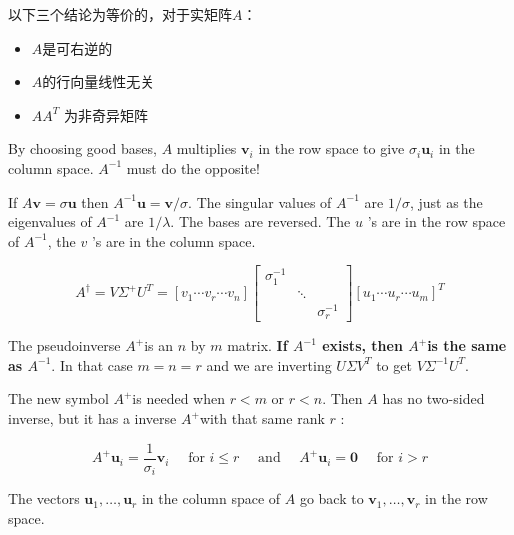 \begin{corollary}
    以下三个结论为等价的，对于实矩阵$A$：

    \begin{itemize}
        \item $A$是可右逆的 
        \item $A$的行向量线性无关
        \item $ A A^{T} $ 为非奇异矩阵
    \end{itemize}
\end{corollary}

By choosing good bases, $A$ multiplies $\boldsymbol{v}_{i}$ in the row space to give $\sigma_{i} \boldsymbol{u}_{i}$ in the column space. $A^{-1}$ must do the opposite! 



If $A \boldsymbol{v}=\sigma \boldsymbol{u}$ then $A^{-1} \boldsymbol{u}=\boldsymbol{v} / \sigma$. The singular values of $A^{-1}$ are $1 / \sigma$, just as the eigenvalues of $A^{-1}$ are $1 / \lambda$. The bases are reversed. The $u$ 's are in the row space of $A^{-1}$, the $v$ 's are in the column space.

\begin{definition}[伪逆$A^{\dagger}$]
    $$A^{\dagger} = V \Sigma^+ U^T = \left[v_{1} \cdots v_{r} \cdots v_{n}\right]\left[\begin{array}{lll}
        \sigma_{1}^{-1} & & \\
        & \ddots & \\
        & & \sigma_{r}^{-1}
        \end{array}\right]\left[u_{1} \cdots u_{r} \cdots u_{m}\right]^{ {T}}$$
\end{definition}

The pseudoinverse $A^{+}$is an $n$ by $m$ matrix. \textbf{If $A^{-1}$ exists, then $A^{+}$is the same as $A^{-1}$}. In that case $m=n=r$ and we are inverting $U \Sigma V^{ {T}}$ to get $V \Sigma^{-1} U^{ {T}}$. 

The new symbol $A^{+}$is needed when $r<m$ or $r<n$. Then $A$ has no two-sided inverse, but it has a inverse $A^{+}$with that same rank $r$ :

$$
A^{+} \boldsymbol{u}_{i}=\frac{1}{\sigma_{i}} \boldsymbol{v}_{i} \quad \text { for } i \leq r \quad \text { and } \quad A^{+} \boldsymbol{u}_{i}=\mathbf{0} \quad \text { for } i>r
$$

The vectors $\boldsymbol{u}_{1}, \ldots, \boldsymbol{u}_{r}$ in the column space of $A$ go back to $\boldsymbol{v}_{1}, \ldots, \boldsymbol{v}_{r}$ in the row space.


